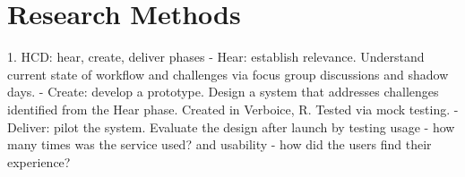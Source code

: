 \section{Research Methods}
1. HCD: hear, create, deliver phases
 - Hear: establish relevance. Understand current state of workflow and challenges via focus group discussions and shadow days. 
 - Create: develop a prototype. Design a system that addresses challenges identified from the Hear phase. Created in Verboice, R. Tested via mock testing. 
 - Deliver: pilot the system. Evaluate the design after launch by testing usage - how many times was the service used? and usability - how did the users find their experience? 
